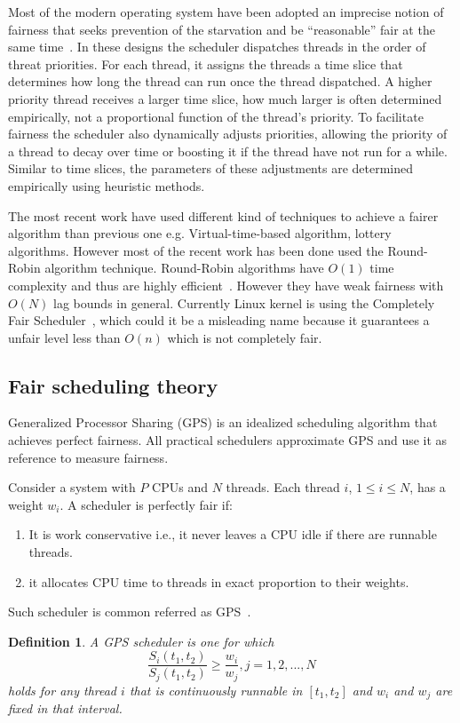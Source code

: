 Most of the modern operating system have been adopted an imprecise notion of fairness that seeks prevention of the starvation and be ``reasonable'' fair at the same time~\cite{li09}. In these designs the scheduler dispatches threads in the order of threat priorities. For each thread, it assigns the threads a time slice that determines how long the thread can run once the thread dispatched. A higher priority thread receives a larger time slice, how much larger is often determined empirically, not a proportional function of the thread's priority. To facilitate fairness the scheduler also dynamically adjusts priorities, allowing the priority of a thread to decay over time or boosting it if the thread have not run for a while. Similar to time slices, the parameters of these adjustments are determined empirically using heuristic methods. 

The most recent work have used different kind of techniques to achieve a fairer algorithm than previous one e.g. Virtual-time-based algorithm, lottery algorithms. However most of the recent work has been done used the Round-Robin algorithm technique. Round-Robin algorithms have $O(1)$ time complexity and thus are highly efficient~\cite{li09}. However they have weak fairness with $O(N)$ lag bounds in general. Currently Linux kernel is using the Completely Fair Scheduler~\cite{jones09}, which could it be a misleading name because it guarantees a unfair level less than $O(n)$ which is not completely fair. 

\subsection{Fair scheduling theory}
Generalized Processor Sharing (GPS) is an idealized scheduling algorithm that achieves perfect fairness. All practical schedulers approximate GPS and use it as reference to measure fairness.

Consider a system with $P$ CPUs and $N$ threads. Each thread $i$, $1 \leq i \leq N$, has a weight $w_i$. A scheduler is perfectly fair if:
\begin{enumerate}
	\item It is work conservative i.e., it never leaves a CPU idle if there are runnable threads.
	\item it allocates CPU time to threads in exact proportion to their weights.
\end{enumerate}
Such scheduler is common referred as GPS~\cite{parekh93}.

\newtheorem{gps-model}{Definition}
\begin{gps-model}
A GPS scheduler is one for which
$$\frac{S_i(t_1, t_2)}{S_j(t_1, t_2)} \geq \frac{w_i}{w_j}, j=1, 2, ..., N$$
holds for any thread $i$ that is continuously runnable in $[t_1, t_2]$ and $w_i$ and $w_j$ are fixed in that interval. 
\end{gps-model}

